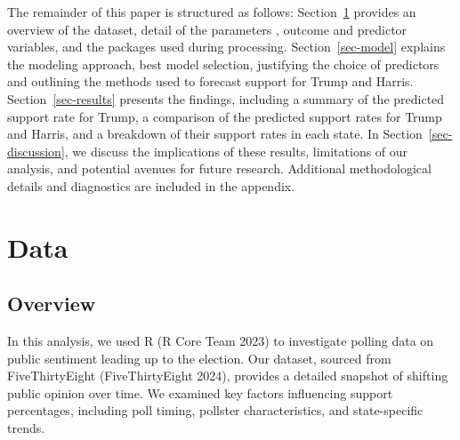 \documentclass[
  letterpaper,
  DIV=11,
  numbers=noendperiod]{scrartcl}
\begin{document}
The remainder of this paper is structured as follows:
Section~\ref{sec-data} provides an overview of the dataset, detail of
the parameters , outcome and predictor variables, and the packages used
during processing. Section~\ref{sec-model} explains the modeling
approach, best model selection, justifying the choice of predictors and
outlining the methods used to forecast support for Trump and Harris.
Section~\ref{sec-results} presents the findings, including a summary of
the predicted support rate for Trump, a comparison of the predicted
support rates for Trump and Harris, and a breakdown of their support
rates in each state. In Section~\ref{sec-discussion}, we discuss the
implications of these results, limitations of our analysis, and
potential avenues for future research. Additional methodological details
and diagnostics are included in the appendix.

\hypertarget{sec-data}{%
\section{Data}\label{sec-data}}

\hypertarget{overview}{%
\subsection{Overview}\label{overview}}

In this analysis, we used R (R Core Team 2023) to investigate polling
data on public sentiment leading up to the election. Our dataset,
sourced from FiveThirtyEight (FiveThirtyEight 2024), provides a detailed
snapshot of shifting public opinion over time. We examined key factors
influencing support percentages, including poll timing, pollster
characteristics, and state-specific trends.
\end{document}
